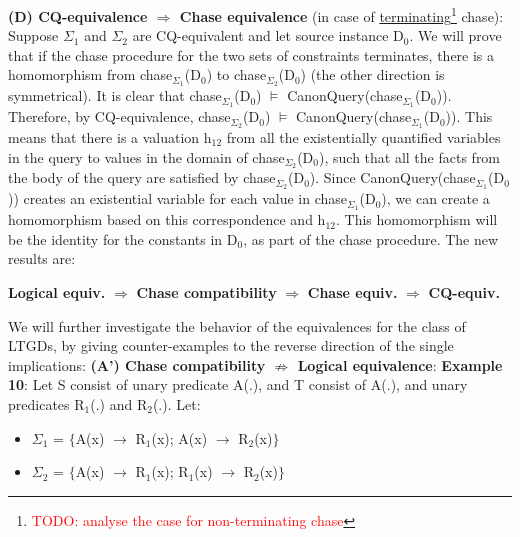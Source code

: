 \documentclass[11pt, a4paper, dvipsnames]{article}
\begin{document}
\textbf{(D) CQ-equivalence $\Rightarrow$ Chase equivalence} (in case of \underline{terminating}\footnote{\textcolor{red}{TODO: analyse the case for non-terminating chase}} chase):\newline
Suppose $\Sigma_{1}$ and $\Sigma_{2}$ are CQ-equivalent and let source instance D$_{0}$. We will prove that if the chase procedure for the two sets of constraints terminates, there is a homomorphism from chase$_{\Sigma_{1}}$(D$_{0}$) to chase$_{\Sigma_{2}}$(D$_{0}$) (the other direction is symmetrical). It is clear that chase$_{\Sigma_{1}}$(D$_{0}$) $\vDash$ CanonQuery(chase$_{\Sigma_{1}}$(D$_{0}$)). Therefore, by CQ-equivalence, chase$_{\Sigma_{2}}$(D$_{0}$) $\vDash$ CanonQuery(chase$_{\Sigma_{1}}$(D$_{0}$)). This means that there is a valuation h$_{12}$ from all the existentially quantified variables in the query to values in the domain of chase$_{\Sigma_{2}}$(D$_{0}$), such that all the facts from the body of the query are satisfied by chase$_{\Sigma_{2}}$(D$_{0}$). Since CanonQuery(chase$_{\Sigma_{1}}$(D$_{0}$)) creates an existential variable for each value in chase$_{\Sigma_{1}}$(D$_{0}$), we can create a homomorphism based on this correspondence and h$_{12}$. This homomorphism will be the identity for the constants in D$_{0}$, as part of the chase procedure.\newline
The new results are:
\begin{center}
\textbf{Logical equiv.} $\Rightarrow$ \textbf{Chase compatibility} $\Rightarrow$ \textbf{Chase equiv.} $\Rightarrow$ \textbf{CQ-equiv.}
\end{center}
We will further investigate the behavior of the equivalences for the class of LTGDs, by giving counter-examples to the reverse direction of the single implications:\newline
\textbf{(A') Chase compatibility $\nRightarrow$ Logical equivalence}:\newline
\textbf{Example 10}: Let S consist of unary predicate A(.), and T consist of A(.), and unary predicates R$_{1}$(.) and R$_{2}$(.). Let:
\begin{itemize}
	\item $\Sigma_{1}$ = $\{$A(x) $\rightarrow$ R$_{1}$(x); A(x) $\rightarrow$ R$_{2}$(x)$\}$
	\item $\Sigma_{2}$ = $\{$A(x) $\rightarrow$ R$_{1}$(x); R$_{1}$(x) $\rightarrow$ R$_{2}$(x)$\}$
\end{itemize}
\begin{center}
\end{center}
\end{document}
